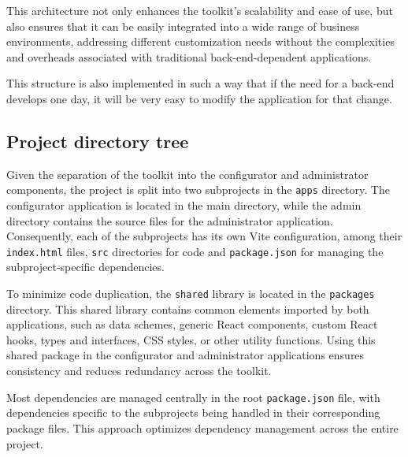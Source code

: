 This architecture not only enhances the toolkit's scalability and ease of use, but also ensures that it can be easily integrated into a wide range of business environments, addressing different customization needs without the complexities and overheads associated with traditional back-end-dependent applications.

This structure is also implemented in such a way that if the need for a back-end develops one day, it will be very easy to modify the application for that change.

\subsection{Project directory tree}

\vspace{16pt}

Given the separation of the toolkit into the configurator and administrator components, the project is split into two subprojects in the \texttt{apps} directory. The configurator application is located in the main directory, while the admin directory contains the source files for the administrator application. Consequently, each of the subprojects has its own Vite configuration, among their \texttt{index.html} files, \texttt{src} directories for code and \texttt{package.json} for managing the subproject-specific dependencies. 

To minimize code duplication, the \texttt{shared} library is located in the \texttt{packages} directory. This shared library contains common elements imported by both applications, such as data schemes, generic React components, custom React hooks, types and interfaces, CSS styles, or other utility functions. Using this shared package in the configurator and administrator applications ensures consistency and reduces redundancy across the toolkit.

Most dependencies are managed centrally in the root \texttt{package.json} file, with dependencies specific to the subprojects being handled in their corresponding package files. This approach optimizes dependency management across the entire project.

